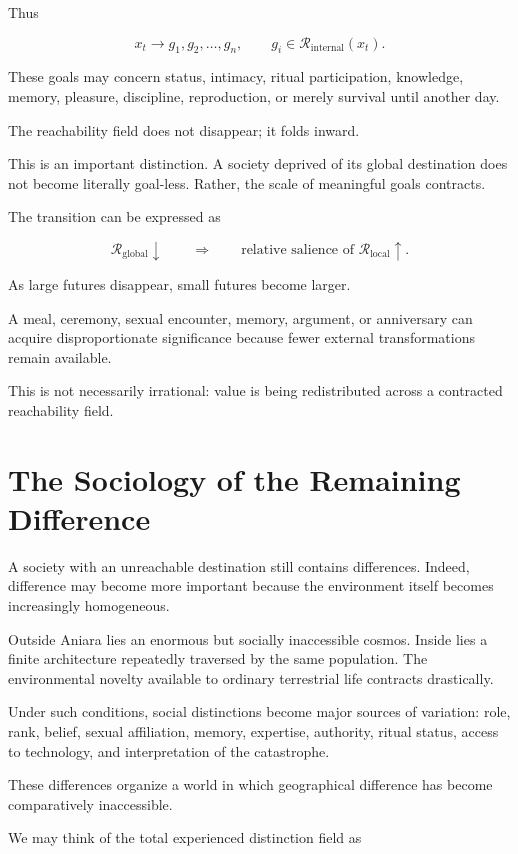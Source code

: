 \documentclass[11pt,oneside]{book}
\theoremstyle{definition}
\theoremstyle{remark}
\newcommand{\R}{\mathcal{R}}
\begin{document}
Thus

\[
x_t
\rightarrow
g_1,g_2,\ldots,g_n,
\qquad
g_i\in\R_{\mathrm{internal}}(x_t).
\]

These goals may concern status, intimacy, ritual participation, knowledge, memory, pleasure, discipline, reproduction, or merely survival until another day.

The reachability field does not disappear; it folds inward.

This is an important distinction. A society deprived of its global destination does not become literally goal-less. Rather, the scale of meaningful goals contracts.

The transition can be expressed as

\[
\R_{\mathrm{global}}\downarrow
\qquad\Longrightarrow\qquad
\text{relative salience of }\R_{\mathrm{local}}\uparrow.
\]

As large futures disappear, small futures become larger.

A meal, ceremony, sexual encounter, memory, argument, or anniversary can acquire disproportionate significance because fewer external transformations remain available.

This is not necessarily irrational: value is being redistributed across a contracted reachability field.

\section{The Sociology of the Remaining Difference}

A society with an unreachable destination still contains differences. Indeed, difference may become more important because the environment itself becomes increasingly homogeneous.

Outside Aniara lies an enormous but socially inaccessible cosmos. Inside lies a finite architecture repeatedly traversed by the same population. The environmental novelty available to ordinary terrestrial life contracts drastically.

Under such conditions, social distinctions become major sources of variation: role, rank, belief, sexual affiliation, memory, expertise, authority, ritual status, access to technology, and interpretation of the catastrophe.

These differences organize a world in which geographical difference has become comparatively inaccessible.

We may think of the total experienced distinction field as
\end{document}

